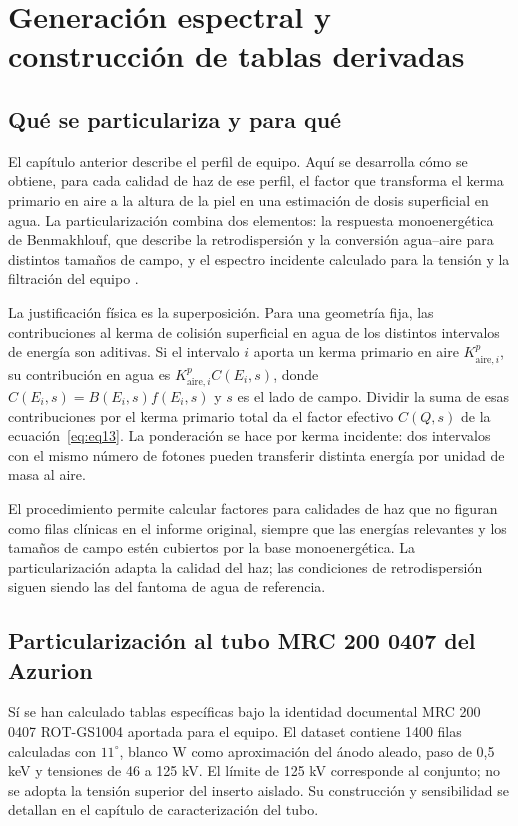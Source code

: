 \chapter{Generación espectral y construcción de tablas derivadas}
\section{Qué se particulariza y para qué}
El capítulo anterior describe el perfil de equipo. Aquí se desarrolla cómo se obtiene, para cada calidad de haz de ese perfil, el factor que transforma el kerma primario en aire a la altura de la piel en una estimación de dosis superficial en agua. La particularización combina dos elementos: la respuesta monoenergética de Benmakhlouf, que describe la retrodispersión y la conversión agua--aire para distintos tamaños de campo, y el espectro incidente calculado para la tensión y la filtración del equipo \citep{benreport,benarticle,spek2020,spek2021}.

La justificación física es la superposición. Para una geometría fija, las contribuciones al kerma de colisión superficial en agua de los distintos intervalos de energía son aditivas. Si el intervalo $i$ aporta un kerma primario en aire $K_{\mathrm{aire},i}^{p}$, su contribución en agua es $K_{\mathrm{aire},i}^{p}C(E_i,s)$, donde $C(E_i,s)=B(E_i,s)f(E_i,s)$ y $s$ es el lado de campo. Dividir la suma de esas contribuciones por el kerma primario total da el factor efectivo $C(Q,s)$ de la ecuación~\eqref{eq:eq13}. La ponderación se hace por kerma incidente: dos intervalos con el mismo número de fotones pueden transferir distinta energía por unidad de masa al aire.

El procedimiento permite calcular factores para calidades de haz que no figuran como filas clínicas en el informe original, siempre que las energías relevantes y los tamaños de campo estén cubiertos por la base monoenergética. La particularización adapta la calidad del haz; las condiciones de retrodispersión siguen siendo las del fantoma de agua de referencia.

\section{Particularización al tubo MRC 200 0407 del Azurion}
Sí se han calculado tablas específicas bajo la identidad documental MRC 200 0407 ROT-GS1004 aportada para el equipo. El dataset  contiene 1400 filas calculadas con $11^\circ$, blanco W como aproximación del ánodo aleado, paso de 0,5 keV y tensiones de 46 a 125 kV. El límite de 125 kV corresponde al conjunto; no se adopta la tensión superior del inserto aislado. Su construcción y sensibilidad se detallan en el capítulo de caracterización del tubo.

